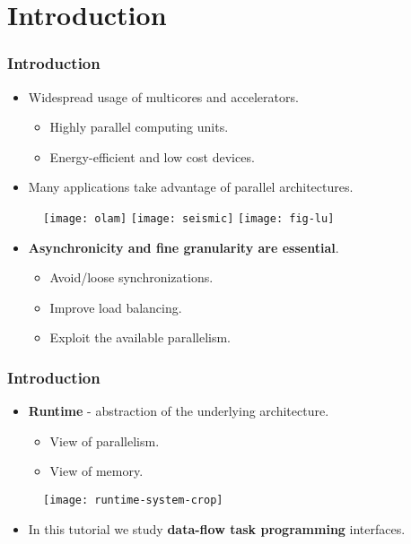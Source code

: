 \section{Introduction}
\begin{frame}
  \frametitle{Introduction}
  \begin{itemize}
  \item Widespread usage of multicores and accelerators.
    \begin{itemize}
    \item Highly parallel computing units.
    \item Energy-efficient and low cost devices.
    \end{itemize}

  \item Many applications take advantage of parallel architectures.
  \end{itemize}
  \begin{center}
    \begin{figure}
      \texttt{[image: olam]}
      \hspace{2mm}
      \texttt{[image: seismic]}
      \hspace{2mm}
      \texttt{[image: fig-lu]}
    \end{figure}
  \end{center}
  \begin{itemize}
  \item {\bf Asynchronicity and fine granularity are essential}.
    \begin{itemize}
    \item Avoid/loose synchronizations.
    \item Improve load balancing.
    \item Exploit the available parallelism.
    \end{itemize}
  \end{itemize}
\end{frame}
\begin{frame}
  \frametitle{Introduction}
  \begin{itemize}
  \item {\bf Runtime} - abstraction of the underlying architecture.
    \begin{itemize}
    \item View of parallelism.
    \item View of memory.
    \end{itemize}
  \end{itemize}
  \begin{figure}
  \centering
  \texttt{[image: runtime-system-crop]}
  \end{figure}
  \begin{itemize}
  \item {\large In this tutorial we study {\bf data-flow task programming} interfaces.}
  \end{itemize}
\end{frame}
